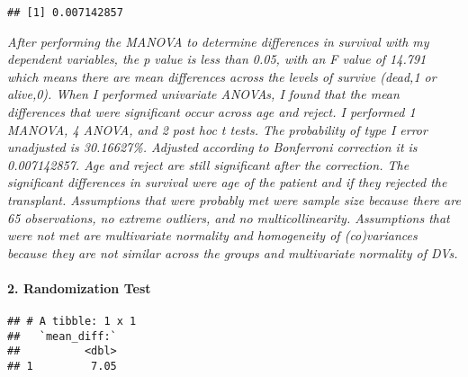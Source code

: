 \documentclass[]{article}
\newenvironment{Shaded}{\begin{snugshade}}{\end{snugshade}}
\newcommand{\DataTypeTok}[1]{\textcolor[rgb]{0.13,0.29,0.53}{#1}}
\newcommand{\KeywordTok}[1]{\textcolor[rgb]{0.13,0.29,0.53}{\textbf{#1}}}
\newcommand{\NormalTok}[1]{#1}
\newcommand{\OperatorTok}[1]{\textcolor[rgb]{0.81,0.36,0.00}{\textbf{#1}}}
\newcommand{\StringTok}[1]{\textcolor[rgb]{0.31,0.60,0.02}{#1}}
\let\oldparagraph\paragraph
\renewcommand{\paragraph}[1]{\oldparagraph{#1}\mbox{}}
\begin{document}
\begin{verbatim}
## [1] 0.007142857
\end{verbatim}

\emph{After performing the MANOVA to determine differences in survival
with my dependent variables, the p value is less than 0.05, with an F
value of 14.791 which means there are mean differences across the levels
of survive (dead,1 or alive,0). When I performed univariate ANOVAs, I
found that the mean differences that were significant occur across age
and reject. I performed 1 MANOVA, 4 ANOVA, and 2 post hoc t tests. The
probability of type I error unadjusted is 30.16627\%. Adjusted according
to Bonferroni correction it is 0.007142857. Age and reject are still
significant after the correction. The significant differences in
survival were age of the patient and if they rejected the transplant.
Assumptions that were probably met were sample size because there are 65
observations, no extreme outliers, and no multicollinearity. Assumptions
that were not met are multivariate normality and homogeneity of
(co)variances because they are not similar across the groups and
multivariate normality of DVs.}

\hypertarget{randomization-test}{%
\paragraph{2. Randomization Test}\label{randomization-test}}

\begin{Shaded}
\end{Shaded}

\begin{verbatim}
## # A tibble: 1 x 1
##   `mean_diff:`
##          <dbl>
## 1         7.05
\end{verbatim}
\end{document}
